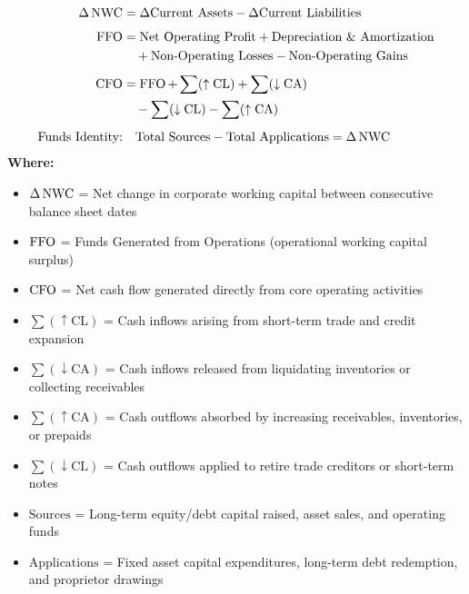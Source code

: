 \newpage
\begin{formulabox}
\begin{align*}
    \Delta \operatorname{NWC} &= \Delta \text{Current Assets} - \Delta \text{Current Liabilities} \\[4pt]
    \operatorname{FFO} &= \text{Net Operating Profit} + \text{Depreciation \& Amortization} \\
        &\quad + \text{Non-Operating Losses} - \text{Non-Operating Gains} \\[4pt]
    \operatorname{CFO} &= \operatorname{FFO} + \sum (\uparrow \text{CL}) + \sum (\downarrow \text{CA}) \\
        &\quad - \sum (\downarrow \text{CL}) - \sum (\uparrow \text{CA}) \\[4pt]
    \text{Funds Identity:} &\quad \text{Total Sources} - \text{Total Applications} = \Delta \operatorname{NWC}
\end{align*}
\textbf{Where:}
\begin{itemize}[noitemsep, topsep=2pt]
    \item $\Delta \operatorname{NWC}$ = Net change in corporate working capital between consecutive balance sheet dates
    \item $\operatorname{FFO}$ = Funds Generated from Operations (operational working capital surplus)
    \item $\operatorname{CFO}$ = Net cash flow generated directly from core operating activities
    \item $\sum (\uparrow \text{CL})$ = Cash inflows arising from short-term trade and credit expansion
    \item $\sum (\downarrow \text{CA})$ = Cash inflows released from liquidating inventories or collecting receivables
    \item $\sum (\uparrow \text{CA})$ = Cash outflows absorbed by increasing receivables, inventories, or prepaids
    \item $\sum (\downarrow \text{CL})$ = Cash outflows applied to retire trade creditors or short-term notes
    \item $\text{Sources}$ = Long-term equity/debt capital raised, asset sales, and operating funds
    \item $\text{Applications}$ = Fixed asset capital expenditures, long-term debt redemption, and proprietor drawings
\end{itemize}
\end{formulabox}

